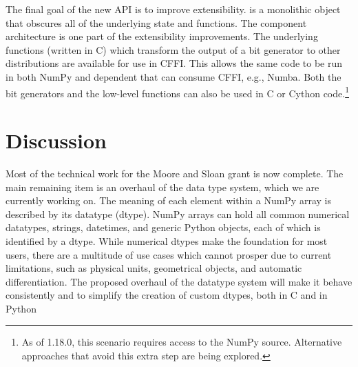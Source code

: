 The final goal of the new API is to improve extensibility.  is
a monolithic object that obscures all of the underlying state and functions. The
component architecture is one part of the extensibility improvements. The
underlying functions (written in C) which transform the output of a bit
generator to other distributions are available for use in CFFI. This allows the
same code to be run in both NumPy and dependent that can consume CFFI, e.g.,
Numba. Both the bit generators and the low-level functions can also be used in C
or Cython code.\footnote{As of 1.18.0, this scenario requires access to the
NumPy source. Alternative approaches that avoid this extra step are being
explored.} 

\section*{Discussion}


Most of the technical work for the Moore and Sloan grant is now complete.
The main remaining item is an overhaul of the data type system, which
we are currently working on.
The meaning of each element within a NumPy array is described by its
datatype (dtype). NumPy arrays can hold all common numerical
datatypes, strings, datetimes, and generic Python objects, each of
which is identified by a dtype.
While numerical dtypes make the foundation for most users,
there are a multitude of use cases which cannot prosper due to current
limitations, such as physical units\cite{astropy,Goldbaum2018,pint},
geometrical objects\cite{pygeos}, and automatic
differentiation\cite{pyadolc}.
The proposed overhaul of the datatype system will make it behave consistently and
to simplify the creation of custom dtypes, both in C and in Python



